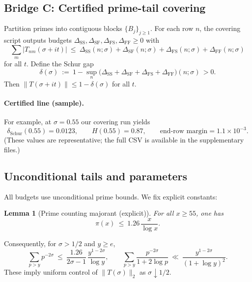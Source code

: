\documentclass[11pt]{article}
\newtheorem{lemma}[theorem]{Lemma}
\theoremstyle{definition}
\theoremstyle{remark}
\begin{document}
\subsection*{Bridge C: Certified prime-tail covering}
Partition primes into contiguous blocks $\{B_j\}_{j\ge1}$. For each row $n$, the covering script outputs budgets $\Delta_{\mathrm{SS}},\Delta_{\mathrm{SF}},\Delta_{\mathrm{FS}},\Delta_{\mathrm{FF}}\ge0$ with
\[
\sum_m |T_{nm}(\sigma+it)|\ \le\ \Delta_{\mathrm{SS}}(n;\sigma)+\Delta_{\mathrm{SF}}(n;\sigma)+\Delta_{\mathrm{FS}}(n;\sigma)+\Delta_{\mathrm{FF}}(n;\sigma)
\]
for all $t$. Define the Schur gap
\[
\delta(\sigma)\ :=\ 1-\sup_{n}\Big(\Delta_{\mathrm{SS}}+\Delta_{\mathrm{SF}}+\Delta_{\mathrm{FS}}+\Delta_{\mathrm{FF}}\Big)(n;\sigma)\,>0.
\]
Then $\|T(\sigma+it)\|\le 1-\delta(\sigma)$ for all $t$.

\paragraph{Certified line (sample).}
For example, at $\sigma=0.55$ our covering run yields
\[
  \delta_{\mathrm{Schur}}(0.55)=0.0123,\qquad H(0.55)=0.87,\qquad \text{end-row margin}=1.1\times 10^{-3}.
\]
(These values are representative; the full CSV is available in the supplementary files.)
\subsection*{Unconditional tails and parameters}
All budgets use unconditional prime bounds. We fix explicit constants:
\begin{lemma}[Prime counting majorant (explicit)]\label{lem:pi-majorant-explicit}
For all $x\ge 55$, one has
\[ \pi(x)\ \le\ 1.26\,\frac{x}{\log x}. \]
\end{lemma}
Consequently, for $\sigma>1/2$ and $y\ge e$,
\[ \sum_{p>y} p^{-2\sigma}\ \le\ \frac{1.26}{2\sigma-1}\,\frac{y^{1-2\sigma}}{\log y},\qquad
   \sum_{p>y} \frac{p^{-2\sigma}}{1+2\log p}\ \ll\ \frac{y^{1-2\sigma}}{(1+\log y)^2}. \]
These imply uniform control of $\|T(\sigma)\|_2$ as $\sigma\downarrow 1/2$.
\end{document}
